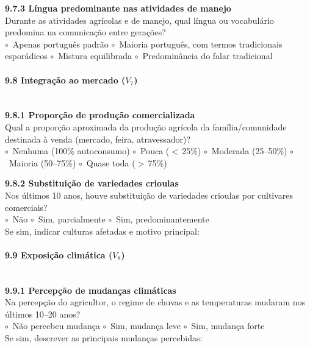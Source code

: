 \medskip\noindent\textbf{9.7.3 Língua predominante nas atividades de manejo}\\[2pt]
Durante as atividades agrícolas e de manejo, qual língua ou vocabulário predomina na comunicação entre gerações?\\
$\circ$~Apenas português padrão \quad $\circ$~Maioria português, com termos tradicionais esporádicos \quad $\circ$~Mistura equilibrada \quad $\circ$~Predominância do falar tradicional

\paragraph{9.8 Integração ao mercado ($V_7$)}~\\[4pt]

\textbf{9.8.1 Proporção de produção comercializada}\\[2pt]
Qual a proporção aproximada da produção agrícola da família/comunidade destinada à venda (mercado, feira, atravessador)?\\
$\circ$~Nenhuma (100\% autoconsumo) \quad $\circ$~Pouca ($<$\,25\%) \quad $\circ$~Moderada (25--50\%) \quad $\circ$~Maioria (50--75\%) \quad $\circ$~Quase toda ($>$\,75\%)

\medskip\noindent\textbf{9.8.2 Substituição de variedades crioulas}\\[2pt]
Nos últimos 10 anos, houve substituição de variedades crioulas por cultivares comerciais?\\
$\circ$~Não \quad $\circ$~Sim, parcialmente \quad $\circ$~Sim, predominantemente\\[2pt]
Se sim, indicar culturas afetadas e motivo principal: \dotfill\\[2pt]\dotfill

\paragraph{9.9 Exposição climática ($V_8$)}~\\[4pt]

\textbf{9.9.1 Percepção de mudanças climáticas}\\[2pt]
Na percepção do agricultor, o regime de chuvas e as temperaturas mudaram nos últimos 10--20 anos?\\
$\circ$~Não percebeu mudança \quad $\circ$~Sim, mudança leve \quad $\circ$~Sim, mudança forte\\[2pt]
Se sim, descrever as principais mudanças percebidas: \dotfill\\[2pt]\dotfill

